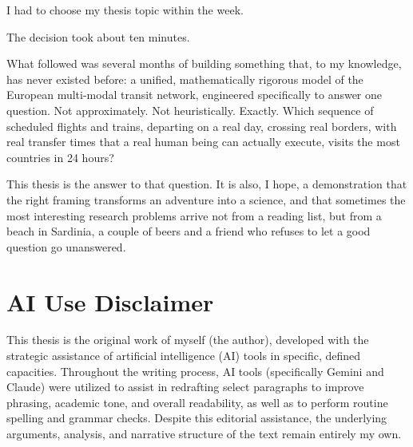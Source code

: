 \documentclass[11pt, a4paper,twoside,openany]{tfg_dtic_upf}
\let\cleardoublepage\clearpage
\numberwithin{equation}{section}
\begin{document}
\medskip

I had to choose my thesis topic within the week.

\medskip

The decision took about ten minutes.

\medskip

What followed was several months of building something that, to my knowledge, has never existed before: a unified, mathematically rigorous model of the European multi-modal transit network, engineered specifically to answer one question. Not approximately. Not heuristically. Exactly. Which sequence of scheduled flights and trains, departing on a real day, crossing real borders, with real transfer times that a real human being can actually execute, visits the most countries in 24 hours?

\medskip

This thesis is the answer to that question. It is also, I hope, a demonstration that the right framing transforms an adventure into a science, and that sometimes the most interesting research problems arrive not from a reading list, but from a beach in Sardinia, a couple of beers and a friend who refuses to let a good question go unanswered.


\cleardoublepage


\tableofcontents

\mainmatter

\chapter*{AI Use Disclaimer}



This thesis is the original work of myself (the author), developed with the strategic assistance of artificial intelligence (AI) tools in specific, defined capacities. Throughout the writing process, AI tools (specifically Gemini and Claude) were utilized to assist in redrafting select paragraphs to improve phrasing, academic tone, and overall readability, as well as to perform routine spelling and grammar checks. Despite this editorial assistance, the underlying arguments, analysis, and narrative structure of the text remain entirely my own.
\end{document}
